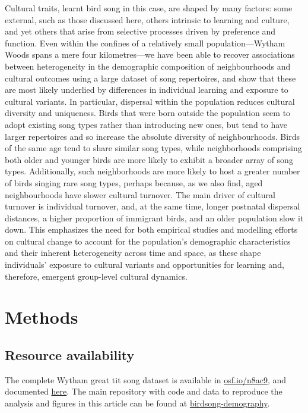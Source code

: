 \documentclass[9pt, onecolumn, twoside, lineno]{gsajnl}
\begin{document}
Cultural traits, learnt bird song in this case, are shaped by many factors: some external, such as those discussed here, others intrinsic to learning and culture, and yet others that arise from selective processes driven by preference and function. Even within the confines of a relatively small population---Wytham Woods spans a mere four kilometres---we have been able to recover associations between heterogeneity in the demographic composition of neighbourhoods and cultural outcomes using a large dataset of song repertoires, and show that these are most likely underlied by differences in individual learning and exposure to cultural variants. In particular, dispersal within the population reduces cultural diversity and uniqueness. Birds that were born outside the population seem to adopt existing song types rather than introducing new ones, but tend to have larger repertoires and so increase the absolute diversity of neighbourhoods. Birds of the same age tend to share similar song types, while neighborhoods comprising both older and younger birds are more likely to exhibit a broader array of song types. Additionally, such neighborhoods are more likely to host a greater number of birds singing rare song types, perhaps because, as we also find, aged neighbourhoods have slower cultural turnover. The main driver of cultural turnover is individual turnover, and, at the same time, longer postnatal dispersal distances, a higher proportion of immigrant birds, and an older population slow it down. This emphasizes the need for both empirical studies and modelling efforts on cultural change to account for the population's demographic characteristics and their inherent heterogeneity across time and space, as these shape individuals' exposure to cultural variants and opportunities for learning and, therefore, emergent group-level cultural dynamics.

\section{Methods}
\label{sc:methods}

\subsection{Resource availability}

The complete Wytham great tit song dataset is available in \href{https://osf.io/n8ac9}{osf.io/n8ac9}, and documented \href{https://nilomr.github.io/great-tit-hits/}{here}. The main repository with code and data to reproduce the analysis and figures in this article can be found at \href{http://github.com/nilomr/birdsong-demography}{birdsong-demography}.
\end{document}
